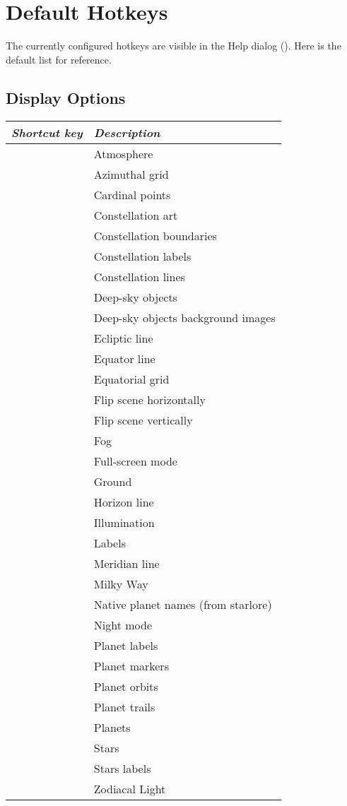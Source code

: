 
\chapter{Default Hotkeys}
\label{ch:Hotkeys}

The currently configured hotkeys are visible in the Help dialog (). Here is the default list for reference.

\section{Display Options}
\label{ch:Hotkeys:DisplayOptions}
\begin{longtabu} to \textwidth {rl}\toprule
\emph{Shortcut key}	& \emph{Description}\\\midrule
{}				& Atmosphere \\
				& Azimuthal grid \\
				& Cardinal points \\
				& Constellation art \\
				& Constellation boundaries \\
				& Constellation labels \\
				& Constellation lines \\
				& Deep-sky objects \\
				& Deep-sky objects background images \\
\key{,} 			& Ecliptic line \\
				& Equator line \\
 			& Equatorial grid \\
	& Flip scene horizontally \\
	& Flip scene vertically \\
 			& Fog \\
 			& Full-screen mode \\
 			& Ground \\
 			& Horizon line \\
		& Illumination \\
	& Labels \\
\key{;} 			& Meridian line \\
 			& Milky Way \\
	& Native planet names (from starlore) \\
 		& Night mode \\
 		& Planet labels \\
		& Planet markers \\
 			& Planet orbits \\
		& Planet trails \\
 			& Planets \\
 			& Stars \\
			& Stars labels \\
	& Zodiacal Light \\
\bottomrule
\end{longtabu}


